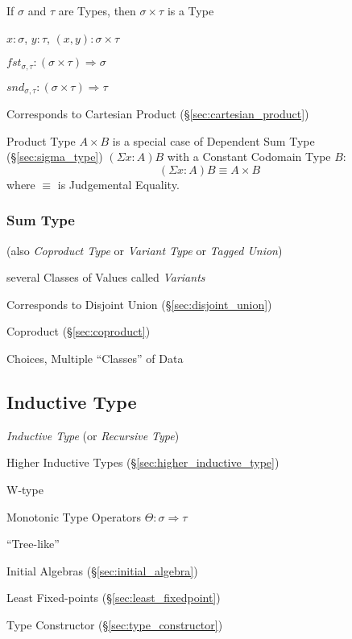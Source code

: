 If $\sigma$ and $\tau$ are Types, then $\sigma \times \tau$ is a Type

$x : \sigma$, $y : \tau$, $(x,y) : \sigma \times \tau$

$fst_{\sigma,\tau} : (\sigma \times \tau) \Rightarrow \sigma$

$snd_{\sigma,\tau} : (\sigma \times \tau) \Rightarrow \tau$

Corresponds to Cartesian Product (\S\ref{sec:cartesian_product})

Product Type $A \times B$ is a special case of Dependent Sum Type
(\S\ref{sec:sigma_type}) $(\Sigma x:A)B$ with a Constant Codomain
Type $B$:
\[
  (\Sigma x:A) B \equiv A \times B
\]
where $\equiv$ is Judgemental Equality.



\subsubsection{Sum Type}\label{sec:sum_type}

(also \emph{Coproduct Type} or \emph{Variant Type} or \emph{Tagged
  Union})

several Classes of Values called \emph{Variants}

Corresponds to Disjoint Union (\S\ref{sec:disjoint_union})

Coproduct (\S\ref{sec:coproduct})

Choices, Multiple ``Classes'' of Data



\subsection{Inductive Type}\label{sec:inductive_type}

\emph{Inductive Type} (or \emph{Recursive Type})

\fist Higher Inductive Types (\S\ref{sec:higher_inductive_type})

W-type

Monotonic Type Operators $\Theta : \sigma \Rightarrow \tau$

``Tree-like''

Initial Algebras (\S\ref{sec:initial_algebra})

Least Fixed-points (\S\ref{sec:least_fixedpoint})

Type Constructor (\S\ref{sec:type_constructor})

